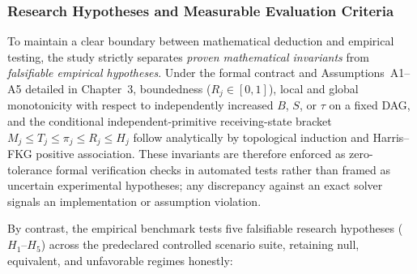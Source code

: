 \subsubsection{Research Hypotheses and Measurable Evaluation Criteria}
\label{research-hypotheses}

To maintain a clear boundary between mathematical deduction and empirical
testing, the study strictly separates \emph{proven mathematical invariants}
from \emph{falsifiable empirical hypotheses}. Under the formal contract and
Assumptions~A1--A5 detailed in Chapter~3, boundedness ($R_j \in [0,1]$), local
and global monotonicity with respect to independently increased $B$, $S$, or
$\tau$ on a fixed DAG, and the conditional independent-primitive
receiving-state bracket $M_j \le T_j \le \pi_j \le R_j \le H_j$ follow
analytically by topological induction and Harris--FKG positive association.
These invariants are therefore enforced as zero-tolerance formal verification
checks in automated tests rather than framed as uncertain experimental
hypotheses; any discrepancy against an exact solver signals an implementation
or assumption violation.

By contrast, the empirical benchmark tests five falsifiable research
hypotheses ($H_1$--$H_5$) across the predeclared controlled scenario suite,
retaining null, equivalent, and unfavorable regimes honestly:


